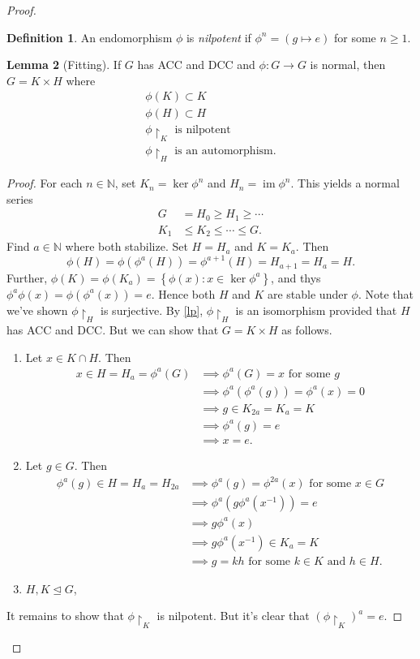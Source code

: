 \documentclass[10pt,letterpaper,cm]{nupset}
\theoremstyle{definition}
\newtheorem{definition}{Definition}[subsection]
\theoremstyle{theorem}
\newtheorem{lemma}[definition]{Lemma}
\theoremstyle{remark}
\newcommand{\N}{\mathbb N}
\newcommand{\1}{\mathbf{1}}
\newcommand{\0}{\vec 0}
\newcommand{\dcc}{\textsf{DCC}\xspace}
\newcommand{\acc}{\textsf{ACC}\xspace}
\DeclareMathOperator{\im}{im}
\begin{document}
\begin{proof}
\begin{definition}
An endomorphism $\phi$ is \textit{nilpotent} if $\phi^n = \left(g \mapsto e\right)$ for some $n\geq 1$.
\end{definition}

\begin{lemma}[Fitting]
If $G$ has \acc and \dcc and $\phi: G \to G$ is normal, then $G = K \times H$ where 
\begin{gather*}
\phi(K)  \subset K
\\ \phi(H)   \subset H
\\  \phi \restriction_K  \text{ is nilpotent}
\\  \phi \restriction_H  \text{ is an automorphism}.
\end{gather*}
\end{lemma}
\begin{proof}
For each $n\in \N$, set $K_n = \ker{\phi^n}$ and $H_n = \im \phi^n$. This yields a normal series \begin{align*}
G & = H_0 \geq H_1 \geq \cdots 
\\ K_1 & \leq K_2 \leq \cdots \leq G.
\end{align*}
Find $a \in \N$ where both stabilize. Set $H = H_a$ and $K = K_a$. Then $$\phi(H) = \phi(\phi^a(H)) = \phi^{a+1}(H) = H_{a+1} = H_a = H.$$ Further, $\phi(K) = \phi(K_a) = \left\{\phi(x) : x \in \ker{\phi^a}\right\}$, and thys $\phi^a\phi(x) = \phi(\phi^a(x)) =e$. Hence both $H$ and $K$ are stable under $\phi$. Note that we've shown $\phi \restriction_H$ is surjective. By \cref{lp}, $\phi \restriction_H$ is an isomorphism provided that $H$ has \acc and \dcc. But we can show that $G = K \times H$ as follows.
\begin{enumerate}[label=(\alph*)]
\item Let $x \in K \cap H$. Then 
\begin{align*}
x \in H = H_a = \phi^a(G) & \implies \phi^a(G) = x \text{ for some }g 
\\ &\implies \phi^a(\phi^a(g)) = \phi^a(x) =  0 
\\ & \implies g \in K_{2a} = K_a = K 
\\ & \implies \phi^a(g) = e 
\\ & \implies x =e.
\end{align*}
\item Let $g \in G$. Then 
\begin{align*} \phi^a(g) \in H = H_a = H_{2a} & \implies \phi^a(g) = \phi^{2a}(x) \text{ for some }x\in G
\\ &  \implies \phi^a(g \phi^a(x^{-1})) =e
\\ &  \implies g\phi^a(x) 
\\ & \implies g\phi^a(x^{-1}) \in K_a =K 
\\ & \implies g = kh \text{ for some }k\in K \text{ and }h\in H.
\end{align*}
\item $H, K \unlhd G$,
\end{enumerate}
It remains to show that $\phi \restriction_K$ is nilpotent. But it's clear that $\left(\phi \restriction_K\right)^a = e$.
\end{proof}


\end{proof}
\end{document}

